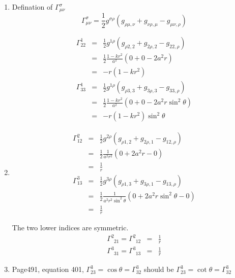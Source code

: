 \documentclass[12pt,a4paper]{article}
\begin{document}
\begin{enumerate}
\item

Defination of $\Gamma^\sigma_{\mu\nu}$
\begin{equation*}
	\Gamma^\sigma_{ \mu\nu} =  \frac12 g^{\sigma \rho}( g_{\rho\mu,\nu} + g_{\nu\rho,\mu} - g_{\mu\nu,\rho} )
\end{equation*}

\begin{eqnarray*}
	\Gamma^1_{22} &=& \frac 1 2 g^{1\rho} ( g_{\rho 2,2} + g_{2\rho,2} - g_{22,\rho}) \\
	&=&\frac 1 2 \frac{1-kr^2}{a^2} ( 0 + 0 - 2a^2 r ) \\
	&=& -r(1-kr^2) \\
	\Gamma^1_{33} &=& \frac 1 2 g^{1\rho}( g_{\rho 3,3} + g_{3\rho,3} - g_{33,\rho} ) \\
	&=& \frac 1 2 \frac{1-kr^2}{a^2}( 0+ 0 - 2 a^2 r \sin^2\theta ) \\
	&=& -r(1-kr^2)\sin^2\theta
\end{eqnarray*}



\item

\begin{eqnarray*}
	\Gamma^2_{12} &=& \frac 1 2 g^{2\rho}( g_{\rho 1,2} + g_{2\rho,1} - g_{12,\rho} ) \\
	&=& \frac 1 2 \frac{1}{a^2r^2} ( 0 + 2a^2 r - 0 )\\
	&=& \frac 1 r \\
	\Gamma^3_{13} &=& \frac 1 2 g^{3\rho} ( g_{\rho 1,3} + g_{3\rho,1} - g_{13,\rho} ) \\
	&=& \frac 1 2 \frac{1}{a^2 r^2 \sin^2\theta } ( 0 + 2 a^2 r \sin^2\theta - 0 )\\
	&=&\frac 1 r
\end{eqnarray*}

The two lower indices are symmetric.
\begin{eqnarray*}
	\Gamma^2_{\phantom 221}=\Gamma^2_{\phantom 212} &=& \frac 1 r \\
	\Gamma^3_{\phantom 331}= \Gamma ^3_{\phantom 313} &=&\frac 1 r
\end{eqnarray*}





\item

{\color{red} Page491, equation 401, $\Gamma^3_{23} = \cos\theta = \Gamma^3_{32}$ should be $\Gamma^3_{23} = \cot\theta = \Gamma^3_{32}$}



\end{enumerate}
\end{document}
